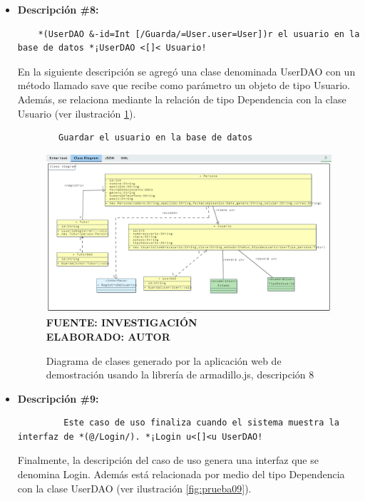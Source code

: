 \begin{itemize}
	\item \textbf{Descripción \#8:}
	\begin{lstlisting}
	*(UserDAO &-id=Int [/Guarda/=User.user=User])r el usuario en la base de datos *¡UserDAO <[]< Usuario! \end{lstlisting}

	En la siguiente descripción se agregó una clase denominada UserDAO con un método llamado save que recibe como parámetro un objeto de tipo Usuario. Además, se relaciona mediante la relación de tipo Dependencia con la clase Usuario (ver ilustración \ref{fig:prueba08}).	
	
	\begin{lstlisting}
		Guardar el usuario en la base de datos \end{lstlisting}

	\begin{figure}[h!]
		\centering
		\caption{Diagrama de clases generado por la aplicación web de demostración usando la librería de armadillo.js, descripción 8}
		\includegraphics[width=15cm]{img/prueba08.png}
		\label{fig:prueba08}
		\vspace{4mm}
		{\footnotesize \textbf{\\ FUENTE: INVESTIGACIÓN} \textbf{\\ ELABORADO: AUTOR}}
	\end{figure}

	\item \textbf{Descripción \#9:}
	\begin{lstlisting}
		 Este caso de uso finaliza cuando el sistema muestra la interfaz de *(@/Login/). *¡Login u<[]<u UserDAO! \end{lstlisting}
	
	Finalmente, la descripción del caso de uso genera una interfaz que se denomina Login. Además está relacionada por medio del tipo Dependencia con la clase UserDAO (ver ilustración \ref{fig:prueba09}).
	

\end{itemize}

